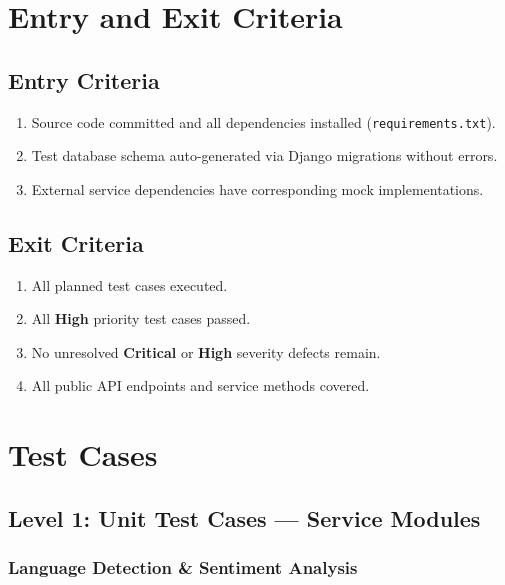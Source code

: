 \documentclass[12pt,a4paper]{report}
\begin{document}
\begin{itemize}
\section{Entry and Exit Criteria}

\subsection{Entry Criteria}

\begin{enumerate}
    \item Source code committed and all dependencies installed (\texttt{requirements.txt}).
    \item Test database schema auto-generated via Django migrations without errors.
    \item External service dependencies have corresponding mock implementations.
\end{enumerate}

\subsection{Exit Criteria}

\begin{enumerate}
    \item All planned test cases executed.
    \item All \textbf{High} priority test cases passed.
    \item No unresolved \textbf{Critical} or \textbf{High} severity defects remain.
    \item All public API endpoints and service methods covered.
\end{enumerate}

\section{Test Cases}

\subsection{Level 1: Unit Test Cases --- Service Modules}

\subsubsection{Language Detection \& Sentiment Analysis}


\end{itemize}
\end{document}

